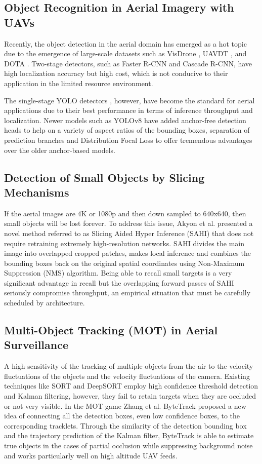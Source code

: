 \documentclass[conference]{IEEEtran}
\begin{document}
\subsection{Object Recognition in Aerial Imagery with UAVs}
Recently, the object detection in the aerial domain has emerged as a hot topic due to the emergence of large-scale datasets such as VisDrone \cite{zhu2021detection}, UAVDT \cite{du2018unmanned}, and DOTA \cite{xia2018dota}. Two-stage detectors, such as Faster R-CNN \cite{ren2015faster} and Cascade R-CNN, have high localization accuracy but high cost, which is not conducive to their application in the limited resource environment. 

The single-stage YOLO detectors \cite{redmon2016you, bochkovskiy2020yolov4, jocher2023ultralytics}, however, have become the standard for aerial applications due to their best performance in terms of inference throughput and localization. Newer models such as YOLOv8 have added anchor-free detection heads to help on a variety of aspect ratios of the bounding boxes, separation of prediction branches and Distribution Focal Loss \cite{li2020generalized} to offer tremendous advantages over the older anchor-based models.

\subsection{Detection of Small Objects by Slicing Mechanisms}
If the aerial images are 4K or 1080p and then down sampled to 640x640, then small objects will be lost forever. To address this issue, Akyon et al. presented a novel method referred to as Slicing Aided Hyper Inference (SAHI) \cite{akyon2022sahi} that does not require retraining extremely high-resolution networks. SAHI divides the main image into overlapped cropped patches, makes local inference and combines the bounding boxes back on the original spatial coordinates using Non-Maximum Suppression (NMS) algorithm. Being able to recall small targets is a very significant advantage in recall but the overlapping forward passes of SAHI seriously compromise throughput, an empirical situation that must be carefully scheduled by architecture.

\subsection{Multi-Object Tracking (MOT) in Aerial Surveillance}
A high sensitivity of the tracking of multiple objects from the air to the velocity fluctuations of the objects and the velocity fluctuations of the camera. Existing techniques like SORT \cite{bewley2016simple} and DeepSORT \cite{wojke2017simple} employ high confidence threshold detection and Kalman filtering, however, they fail to retain targets when they are occluded or not very visible. In the MOT game Zhang et al. ByteTrack \cite{zhang2022bytetrack} proposed a new idea of connecting all the detection boxes, even low confidence boxes, to the corresponding tracklets. Through the similarity of the detection bounding box and the trajectory prediction of the Kalman filter, ByteTrack is able to estimate true objects in the cases of partial occlusion while suppressing background noise and works particularly well on high altitude UAV feeds.
\end{document}
